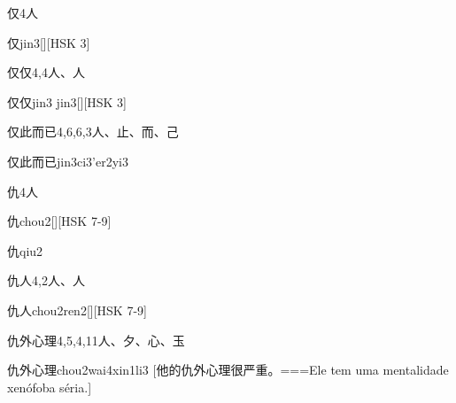 \begin{Entry}{仅}{4}{⼈}
  \begin{Phonetics}{仅}{jin3}[][HSK 3]
  \end{Phonetics}
\end{Entry}

\begin{Entry}{仅仅}{4,4}{⼈、⼈}
  \begin{Phonetics}{仅仅}{jin3 jin3}[][HSK 3]
  \end{Phonetics}
\end{Entry}

\begin{Entry}{仅此而已}{4,6,6,3}{⼈、⽌、⽽、⼰}
  \begin{Phonetics}{仅此而已}{jin3ci3'er2yi3}
  \end{Phonetics}
\end{Entry}

\begin{Entry}{仇}{4}{⼈}
  \begin{Phonetics}{仇}{chou2}[][HSK 7-9]
  \end{Phonetics}
  \begin{Phonetics}{仇}{qiu2}
  \end{Phonetics}
\end{Entry}

\begin{Entry}{仇人}{4,2}{⼈、⼈}
  \begin{Phonetics}{仇人}{chou2ren2}[][HSK 7-9]
  \end{Phonetics}
\end{Entry}

\begin{Entry}{仇外心理}{4,5,4,11}{⼈、⼣、⼼、⽟}
  \begin{Phonetics}{仇外心理}{chou2wai4xin1li3}
    [他的仇外心理很严重。===Ele tem uma mentalidade xenófoba séria.]
  \end{Phonetics}
\end{Entry}

